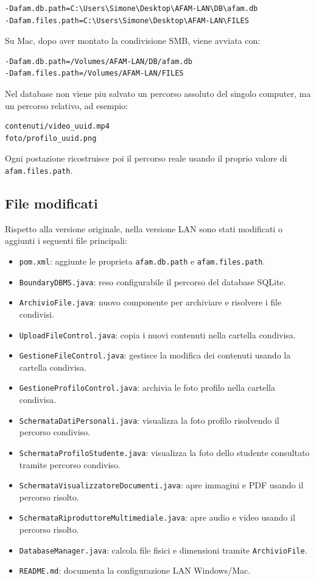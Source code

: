 \documentclass[a4paper,12pt]{article}
\begin{document}
\begin{verbatim}
-Dafam.db.path=C:\Users\Simone\Desktop\AFAM-LAN\DB\afam.db
-Dafam.files.path=C:\Users\Simone\Desktop\AFAM-LAN\FILES
\end{verbatim}

Su Mac, dopo aver montato la condivisione SMB, viene avviata con:

\begin{verbatim}
-Dafam.db.path=/Volumes/AFAM-LAN/DB/afam.db
-Dafam.files.path=/Volumes/AFAM-LAN/FILES
\end{verbatim}

Nel database non viene piu salvato un percorso assoluto del singolo computer, ma
un percorso relativo, ad esempio:

\begin{verbatim}
contenuti/video_uuid.mp4
foto/profilo_uuid.png
\end{verbatim}

Ogni postazione ricostruisce poi il percorso reale usando il proprio valore di
\texttt{afam.files.path}.

\subsection{File modificati}

Rispetto alla versione originale, nella versione LAN sono stati modificati o
aggiunti i seguenti file principali:

\begin{itemize}
    \item \texttt{pom.xml}: aggiunte le proprieta \texttt{afam.db.path} e
    \texttt{afam.files.path}.
    \item \texttt{BoundaryDBMS.java}: reso configurabile il percorso del database
    SQLite.
    \item \texttt{ArchivioFile.java}: nuovo componente per archiviare e risolvere
    i file condivisi.
    \item \texttt{UploadFileControl.java}: copia i nuovi contenuti nella cartella
    condivisa.
    \item \texttt{GestioneFileControl.java}: gestisce la modifica dei contenuti
    usando la cartella condivisa.
    \item \texttt{GestioneProfiloControl.java}: archivia le foto profilo nella
    cartella condivisa.
    \item \texttt{SchermataDatiPersonali.java}: visualizza la foto profilo
    risolvendo il percorso condiviso.
    \item \texttt{SchermataProfiloStudente.java}: visualizza la foto dello
    studente consultato tramite percorso condiviso.
    \item \texttt{SchermataVisualizzatoreDocumenti.java}: apre immagini e PDF
    usando il percorso risolto.
    \item \texttt{SchermataRiproduttoreMultimediale.java}: apre audio e video
    usando il percorso risolto.
    \item \texttt{DatabaseManager.java}: calcola file fisici e dimensioni tramite
    \texttt{ArchivioFile}.
    \item \texttt{README.md}: documenta la configurazione LAN Windows/Mac.
\end{itemize}
\end{document}
